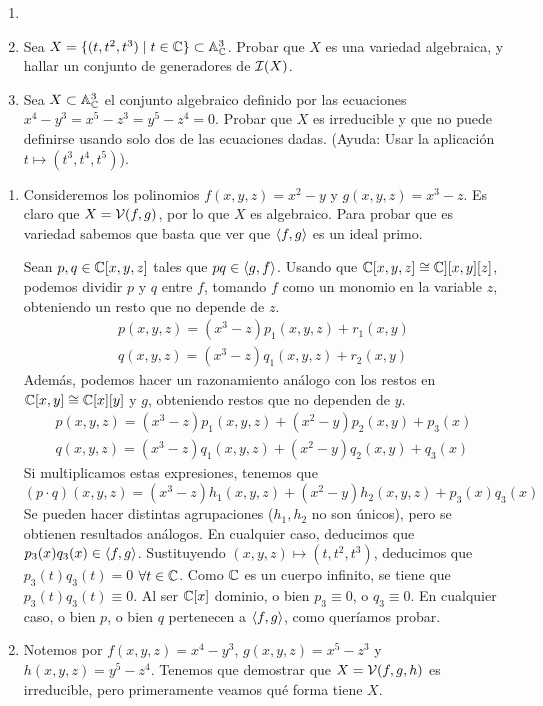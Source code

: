 \documentclass[twoside]{article}
\begin{document}
\begin{ejercicio}{6}
\begin{enumerate}
\item[]
\item Sea $X=\{(t,t^2,t^3)\mid t\in\mathbb{C}\} \subset \mathbb{A}^3_{\mathbb{C}}$. Probar que $X$ es una variedad algebraica, y hallar un conjunto de generadores de $\mathcal{I}(X)$.
\item Sea $X\subset \mathbb{A}^3_{\mathbb{C}}$ el conjunto algebraico definido por las ecuaciones $x^4-y^3=x^5-z^3= y^5 -z^4 = 0$. Probar que $X$ es irreducible y que no puede definirse usando solo dos de las ecuaciones dadas. (Ayuda: Usar la aplicación $t\mapsto (t^3,t^4,t^5)$).
\end{enumerate} 
\begin{solucion}
\item[]
\begin{enumerate}
\item Consideremos los polinomios $f(x,y,z) = x^2-y$ y $g(x,y,z)=x^3-z$. Es claro que $X=\mathcal{V}(f,g)$, por lo que $X$ es algebraico. Para probar que es variedad sabemos que basta que ver que $\langle{f,g}\rangle$ es un ideal primo.

Sean $p,q\in\mathbb{C}[x,y,z]$ tales que $pq\in \langle{g,f}\rangle$. Usando que $\mathbb{C}[x,y,z] \cong \mathbb{C}][x,y][z]$, podemos dividir $p$ y $q$ entre $f$, tomando $f$ como un monomio en la variable $z$, obteniendo un resto que no depende de $z$. 
\begin{gather*}
p(x,y,z)=(x^3-z)p_1(x,y,z) + r_1(x,y)\\
q(x,y,z)=(x^3-z)q_1(x,y,z) + r_2(x,y)
\end{gather*}
Además, podemos hacer un razonamiento análogo con los restos en $\mathbb{C}[x,y]\cong \mathbb{C}[x][y]$ y $g$, obteniendo restos que no dependen de $y$. 
\begin{gather*}
p(x,y,z)=(x^3-z)p_1(x,y,z) + (x^2-y)p_2(x,y) + p_3(x)\\
q(x,y,z)=(x^3-z)q_1(x,y,z) + (x^2-y)q_2(x,y) + q_3(x)
\end{gather*}
Si multiplicamos estas expresiones, tenemos que
\[
(p\cdot q)(x,y,z) = (x^3-z)h_1(x,y,z)+(x^2-y)h_2(x,y,z) + p_3(x)q_3(x)
\]
Se pueden hacer distintas agrupaciones ($h_1,h_2$ no son únicos), pero se obtienen resultados análogos. En cualquier caso, deducimos que $p_3(x)q_3(x)\in \langle{f,g}\rangle$. Sustituyendo $(x,y,z)\mapsto(t,t^2,t^3)$, deducimos que $p_3(t)q_3(t)=0$ $\forall t\in \mathbb{C}$. Como $\mathbb{C}$ es un cuerpo infinito, se tiene que $p_3(t)q_3(t)\equiv 0$. Al ser $\mathbb{C}[x]$ dominio, o bien $p_3 \equiv 0$, o $q_3 \equiv 0$. En cualquier caso, o bien $p$, o bien $q$ pertenecen a $\langle{f,g}\rangle$, como queríamos probar.
\item Notemos por $f(x,y,z)=x^4-y^3$, $g(x,y,z)=x^5-z^3$ y $h(x,y,z)=y^5-z^4$. Tenemos que demostrar que $X=\mathcal{V}(f,g,h)$ es irreducible, pero primeramente veamos qué forma tiene $X$.


\end{enumerate}
\end{solucion}
\end{ejercicio}
\end{document}
